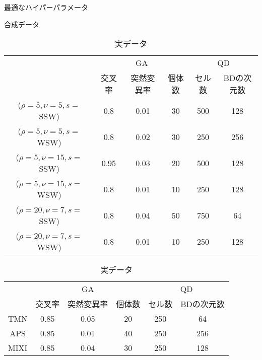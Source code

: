\documentclass[uplatex,11pt,openany]{ujreport}
\begin{document}
        \begin{table}[htbp]
            \caption{最適なハイパーパラメータ}
            \label{tab:hyperparameter}
            \centering

            \begin{subtable}[h]{\textwidth}
                \centering
                \caption{合成データ}
                \begin{tabular}{c|ccc|cc}
                    \hline
                                            & \multicolumn{3}{c|}{GA} & \multicolumn{2}{c}{QD} \\
                                            & 交叉率    & 突然変異率  & 個体数  & セル数      & BDの次元数      \\  \hline
                    ($\rho=5,\nu=5,s=$SSW)  & 0.8    & 0.01   & 30   & 500      & 128         \\
                    ($\rho=5,\nu=5,s=$WSW)  & 0.8    & 0.02   & 30   & 250      & 256         \\
                    ($\rho=5,\nu=15,s=$SSW) & 0.95   & 0.03   & 20   & 500      & 128         \\
                    ($\rho=5,\nu=15,s=$WSW) & 0.8    & 0.01   & 10   & 250      & 128         \\
                    ($\rho=20,\nu=7,s=$SSW) & 0.8    & 0.04   & 50   & 750      & 64          \\
                    ($\rho=20,\nu=7,s=$WSW) & 0.8    & 0.01   & 10   & 250      & 128         \\ \hline
                \end{tabular}
            \end{subtable}

            \vspace{1zh}

            \begin{subtable}[h]{\textwidth}
                \centering
                \caption{実データ}
                \begin{tabular}{c|ccc|cc}
                    \hline
                        & \multicolumn{3}{c|}{GA} & \multicolumn{2}{c}{QD} \\
                        & 交叉率   & 突然変異率   & 個体数   & セル数      & BDの次元数      \\ \hline
                    TMN  & 0.85   & 0.05    & 20    & 250      & 64         \\
                    APS  & 0.85   & 0.01    & 40    & 250      & 256         \\
                    MIXI & 0.85   & 0.04    & 30    & 250      & 128         \\ \hline
                \end{tabular}
            \end{subtable}

        \end{table}
\end{document}
